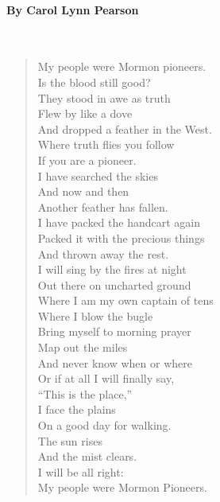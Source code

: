 \documentclass[10pt, letterpaper]{memoir}
\begin{document}
\paragraph{By Carol Lynn Pearson}~
\begin{verse}
	My people were Mormon pioneers.\\
	Is the blood still good?\\
	They stood in awe as truth\\
	Flew by like a dove\\
	And dropped a feather in the West.\\
	Where truth flies you follow\\
	If you are a pioneer.\\
	I have searched the skies\\
	And now and then\\
	Another feather has fallen.\\
	I have packed the handcart again\\
	Packed it with the precious things\\
	And thrown away the rest.\\
	I will sing by the fires at night\\
	Out there on uncharted ground\\
	Where I am my own captain of tens\\
	Where I blow the bugle\\
	Bring myself to morning prayer\\
	Map out the miles\\
	And never know when or where\\
	Or if at all I will finally say,\\
	“This is the place,”\\
	I face the plains\\
	On a good day for walking.\\
	The sun rises\\
	And the mist clears.\\
	I will be all right:\\
	My people were Mormon Pioneers.
\end{verse}
\end{document}
